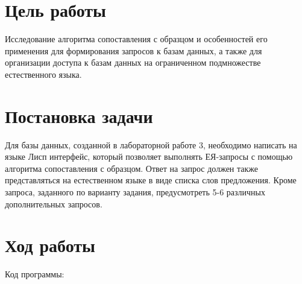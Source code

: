 \documentclass[a4paper,14pt]{extarticle}
\begin{document}


\section{Цель работы}
Исследование алгоритма сопоставления с образцом и особенностей его применения
для формирования запросов к базам данных, а также для организации доступа к
базам данных на ограниченном подмножестве естественного языка.

\section{Постановка задачи}
Для базы данных, созданной в лабораторной работе 3, необходимо написать на языке
Лисп интерфейс, который позволяет выполнять ЕЯ-запросы с помощью алгоритма
сопоставления с образцом. Ответ на запрос должен также представляться на
естественном языке в виде списка слов предложения. Кроме запроса, заданного по
варианту задания, предусмотреть 5-6 различных дополнительных запросов.

\section{Ход работы}
Код программы:
\end{document}

